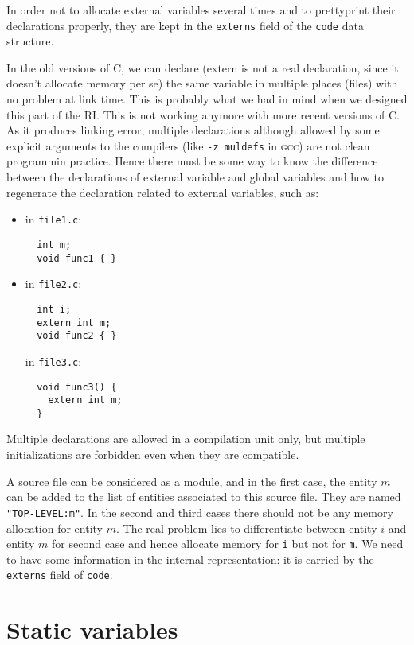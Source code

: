 \documentclass[a4paper]{report}
\begin{document}
In order not to allocate external variables several times and to
 prettyprint their declarations properly, they are kept in the
 \verb/externs/ field of the \verb/code/ data structure.

In the old versions of C, we can declare (extern is not a real
 declaration, since it doesn't allocate memory per se) the same
 variable in multiple places (files) with no problem at link
 time. This is probably what we had in mind when we designed this part
 of the RI.
This is not working anymore with more recent versions of C. As it
 produces linking error, multiple declarations although allowed by
 some explicit arguments to the compilers (like \verb/-z muldefs/ in
 \textsc{gcc}) are not clean programmin practice. Hence there must be
 some way to know the difference between the declarations of external
 variable and global variables and how to regenerate the declaration
 related to external variables, such as:
\begin{itemize}
\item in \texttt{file1.c}:
\begin{lstlisting}
  int m;
  void func1 { }
\end{lstlisting}
\item in \texttt{file2.c}:
\begin{lstlisting}
  int i;
  extern int m;
  void func2 { }
\end{lstlisting}
in \texttt{file3.c}:
\begin{lstlisting}
  void func3() {
    extern int m;
  }
\end{lstlisting}
\end{itemize}

Multiple declarations are allowed in a compilation unit only, but
 multiple initializations are forbidden even when they are compatible.

A source file can be considered as a module, and in the first case,
 the entity $m$ can be added to the list of entities associated to
 this source file. They are named \verb/"TOP-LEVEL:m"/. In the
 second and third cases there should not be any memory allocation for
 entity $m$. The real problem lies to differentiate between entity $i$
 and entity $m$ for second case and hence allocate memory for \verb/i/ but
 not for \verb/m/. We need to have some information in the internal
 representation: it is carried by the \verb/externs/ field of
 \verb/code/.

\section{Static variables}
\end{document}
